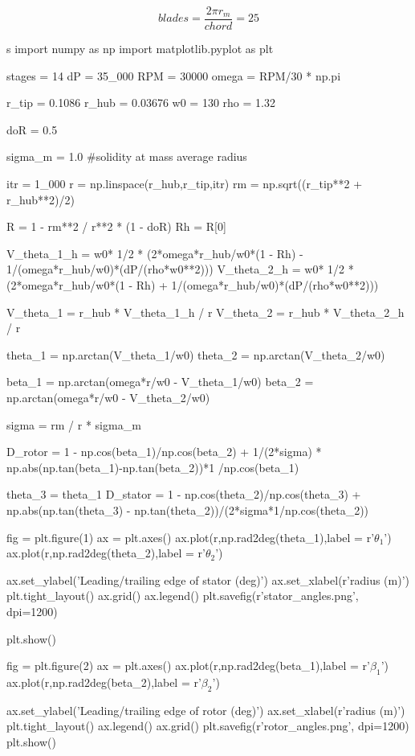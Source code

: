 \documentclass[conf]{new-aiaa}
\begin{document}
\begin{equation*}
    \boxed{blades = \frac{2 \pi r_m}{chord} = 25}
\end{equation*}
\clearpage

\begin{python}s
import numpy as np
import matplotlib.pyplot as plt

stages = 14
dP = 35_000
RPM = 30000
omega = RPM/30 * np.pi

r_tip = 0.1086
r_hub = 0.03676
w0 = 130
rho = 1.32

doR = 0.5 

sigma_m = 1.0 #solidity at mass average radius

itr = 1_000
r = np.linspace(r_hub,r_tip,itr)
rm = np.sqrt((r_tip**2 + r_hub**2)/2)

R = 1 - rm**2 / r**2 * (1 - doR)
Rh = R[0]

V_theta_1_h = w0* 1/2 * (2*omega*r_hub/w0*(1 - Rh) - 1/(omega*r_hub/w0)*(dP/(rho*w0**2))) 
V_theta_2_h = w0* 1/2 * (2*omega*r_hub/w0*(1 - Rh) + 1/(omega*r_hub/w0)*(dP/(rho*w0**2))) 


V_theta_1 = r_hub * V_theta_1_h / r
V_theta_2 = r_hub * V_theta_2_h / r 

theta_1 = np.arctan(V_theta_1/w0) 
theta_2 = np.arctan(V_theta_2/w0)

beta_1 = np.arctan(omega*r/w0 - V_theta_1/w0)
beta_2 = np.arctan(omega*r/w0 - V_theta_2/w0)

sigma = rm / r * sigma_m

D_rotor = 1 - np.cos(beta_1)/np.cos(beta_2) + 1/(2*sigma) * np.abs(np.tan(beta_1)-np.tan(beta_2))*1 /np.cos(beta_1)

theta_3 = theta_1
D_stator = 1 - np.cos(theta_2)/np.cos(theta_3) + np.abs(np.tan(theta_3) - np.tan(theta_2))/(2*sigma*1/np.cos(theta_2))

fig = plt.figure(1)
ax = plt.axes()
ax.plot(r,np.rad2deg(theta_1),label = r'$\theta_1$')
ax.plot(r,np.rad2deg(theta_2),label = r'$\theta_2$')


ax.set_ylabel('Leading/trailing edge of stator (deg)')
ax.set_xlabel(r'radius (m)')
plt.tight_layout()
ax.grid()
ax.legend()
plt.savefig(r'stator_angles.png', dpi=1200)

plt.show()

fig = plt.figure(2)
ax = plt.axes()
ax.plot(r,np.rad2deg(beta_1),label = r'$\beta_1$')
ax.plot(r,np.rad2deg(beta_2),label = r'$\beta_2$')

ax.set_ylabel('Leading/trailing edge of rotor (deg)')
ax.set_xlabel(r'radius (m)')
plt.tight_layout()
ax.legend()
ax.grid()
plt.savefig(r'rotor_angles.png', dpi=1200)
plt.show()


\end{python}
\end{document}
